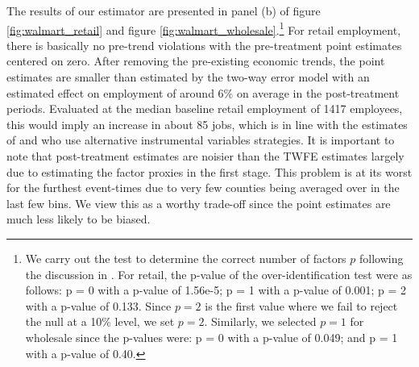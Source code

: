 \begin{figure}
\end{figure}

The results of our estimator are presented in panel (b) of figure \ref{fig:walmart_retail} and figure \ref{fig:walmart_wholesale}.\footnote{We carry out the test to determine the correct number of factors $p$ following the discussion in \citet{Ahn_Lee_Schmidt_2013}. For retail, the p-value of the over-identification test were as follows: p = 0 with a p-value of 1.56e-5; p = 1 with a p-value of 0.001; p = 2 with a p-value of 0.133.  Since $p = 2$ is the first value where we fail to reject the null at a 10\% level, we set $p = 2$. Similarly, we selected $p = 1$ for wholesale since the p-values were: p = 0 with a p-value of 0.049; and p = 1 with a p-value of 0.40.} For retail employment, there is basically no pre-trend violations with the pre-treatment point estimates centered on zero. After removing the pre-existing economic trends, the point estimates are smaller than estimated by the two-way error model with an estimated effect on employment of around 6\% on average in the post-treatment periods. Evaluated at the median baseline retail employment of 1417 employees, this would imply an increase in about 85 jobs, which is in line with the estimates of \citet{basker2005job} and \citet{stapp2014Walmart} who use alternative instrumental variables strategies. It is important to note that post-treatment estimates are noisier than the TWFE estimates largely due to estimating the factor proxies in the first stage. This problem is at its worst for the furthest event-times due to very few counties being averaged over in the last few bins. We view this as a worthy trade-off since the point estimates are much less likely to be biased. 

